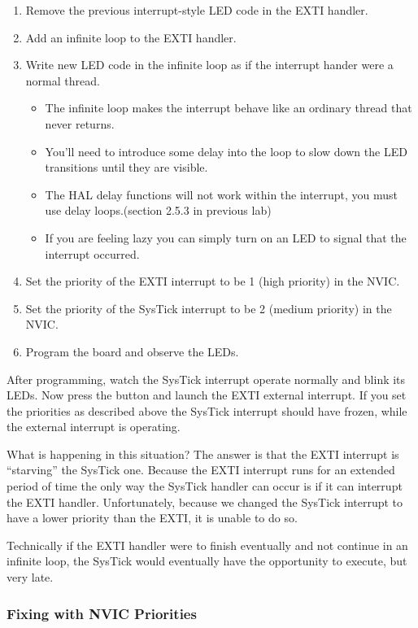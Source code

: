 \documentclass[11pt,fleqn]{book} %
\begin{document}
\begin{enumerate}
    \item Remove the previous interrupt-style LED code in the EXTI handler.
    \item Add an infinite loop to the EXTI handler.
    \item Write new LED code in the infinite loop as if the interrupt hander were a normal thread.
    \begin{itemize}
        \item The infinite loop makes the interrupt behave like an ordinary thread that never returns.
        \item You'll need to introduce some delay into the loop to slow down the LED transitions until they are visible.
        \item The HAL delay functions will not work within the interrupt, you must use delay loops.(section 2.5.3 in previous lab)
        \item If you are feeling lazy you can simply turn on an LED to signal that the interrupt occurred.
    \end{itemize}
    \item Set the priority of the EXTI interrupt to be 1 (high priority) in the NVIC.
    \item Set the priority of the SysTick interrupt to be 2 (medium priority) in the NVIC.
    \item Program the board and observe the LEDs.
\end{enumerate}

After programming, watch the SysTick interrupt operate normally and blink its LEDs. Now press the button and launch the EXTI external interrupt. If you set the priorities as described above the SysTick interrupt should have frozen, while the external interrupt is operating. 

What is happening in this situation? The answer is that the EXTI interrupt is ``starving'' the SysTick one. Because the EXTI interrupt runs for an extended period of time the only way the SysTick handler can occur is if it can interrupt the EXTI handler. Unfortunately, because we changed the SysTick interrupt to have a lower priority than the EXTI, it is unable to do so.

Technically if the EXTI handler were to finish eventually and not continue in an infinite loop, the SysTick would eventually have the opportunity to execute, but very late.    

\subsubsection{Fixing with NVIC Priorities}
\end{document}
